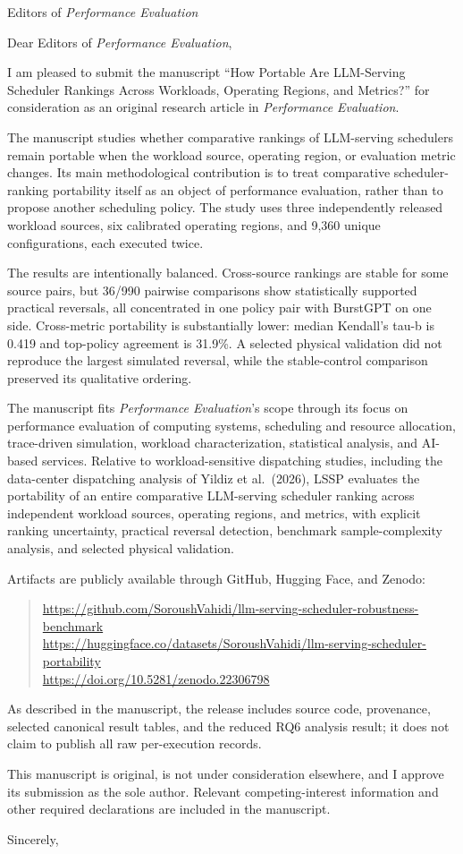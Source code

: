 \documentclass[10pt]{letter}
\date{September 28, 2026}
\begin{document}
\begin{letter}{Editors of \emph{Performance Evaluation}}

\opening{Dear Editors of \emph{Performance Evaluation},}

I am pleased to submit the manuscript ``How Portable Are LLM-Serving
Scheduler Rankings Across Workloads, Operating Regions, and Metrics?'' for
consideration as an original research article in \emph{Performance
Evaluation}.

The manuscript studies whether comparative rankings of LLM-serving
schedulers remain portable when the workload source, operating region, or
evaluation metric changes. Its main methodological contribution is to treat
comparative scheduler-ranking portability itself as an object of performance
evaluation, rather than to propose another scheduling policy. The study uses
three independently released workload sources, six calibrated operating
regions, and 9,360 unique configurations, each executed twice.

The results are intentionally balanced. Cross-source rankings are stable for
some source pairs, but 36/990 pairwise comparisons show statistically
supported practical reversals, all concentrated in one policy pair with
BurstGPT on one side. Cross-metric portability is substantially lower:
median Kendall's tau-b is 0.419 and top-policy agreement is 31.9\%. A
selected physical validation did not reproduce the largest simulated
reversal, while the stable-control comparison preserved its qualitative
ordering.

The manuscript fits \emph{Performance Evaluation}'s scope through its focus
on performance evaluation of computing systems, scheduling and resource
allocation, trace-driven simulation, workload characterization, statistical
analysis, and AI-based services. Relative to workload-sensitive dispatching
studies, including the data-center dispatching analysis of Yildiz et al.\
(2026), LSSP evaluates the
portability of an entire comparative LLM-serving scheduler ranking across
independent workload sources, operating regions, and metrics, with explicit
ranking uncertainty, practical reversal detection, benchmark
sample-complexity analysis, and selected physical validation.

Artifacts are publicly available through GitHub, Hugging Face, and Zenodo:
\begin{quote}\small
\url{https://github.com/SoroushVahidi/llm-serving-scheduler-robustness-benchmark}\\
\url{https://huggingface.co/datasets/SoroushVahidi/llm-serving-scheduler-portability}\\
\url{https://doi.org/10.5281/zenodo.22306798}
\end{quote}
As described in the manuscript, the release includes source code, provenance,
selected canonical result tables, and the reduced RQ6 analysis result; it
does not claim to publish all raw per-execution records.

This manuscript is original, is not under consideration elsewhere, and I
approve its submission as the sole author. Relevant competing-interest
information and other required declarations are included in the manuscript.

\closing{Sincerely,}

\end{letter}
\end{document}
